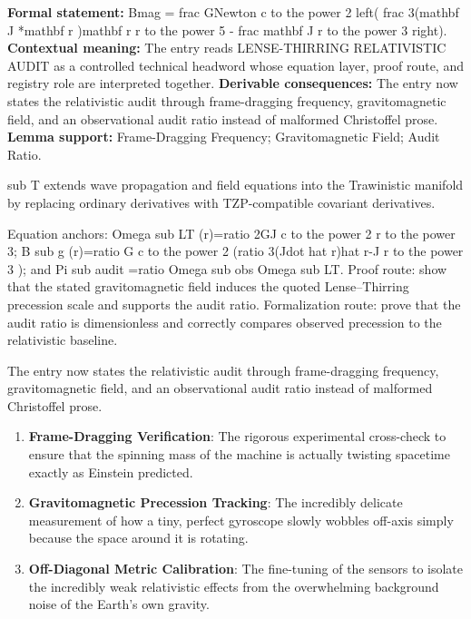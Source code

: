 \begingroup\footnotesize\setlength{\emergencystretch}{3em}\sloppy
\textbf{Formal statement:} Bmag = frac GNewton c to the power 2 left( frac 3(mathbf J *mathbf r )mathbf r r to the power 5 - frac mathbf J r to the power 3 right). \textbf{Contextual meaning:} The entry reads LENSE-THIRRING RELATIVISTIC AUDIT as a controlled technical headword whose equation layer, proof route, and registry role are interpreted together. \textbf{Derivable consequences:} The entry now states the relativistic audit through frame-dragging frequency, gravitomagnetic field, and an observational audit ratio instead of malformed Christoffel prose. \textbf{Lemma support:} Frame-Dragging Frequency; Gravitomagnetic Field; Audit Ratio.\par
\endgroup

sub T extends wave propagation and field equations into the Trawinistic manifold by replacing ordinary derivatives with TZP-compatible covariant derivatives.

Equation anchors: Omega sub LT (r)=ratio 2GJ c to the power 2 r to the power 3; B sub g (r)=ratio G c to the power 2 (ratio 3(Jdot hat r)hat r-J r to the power 3 ); and Pi sub audit =ratio Omega sub obs Omega sub LT. Proof route: show that the stated gravitomagnetic field induces the quoted Lense--Thirring precession scale and supports the audit ratio. Formalization route: prove that the audit ratio is dimensionless and correctly compares observed precession to the relativistic baseline.

The entry now states the relativistic audit through frame-dragging frequency, gravitomagnetic field, and an observational audit ratio instead of malformed Christoffel prose.
\endgroup

\begin{enumerate}[leftmargin=1.6em,itemsep=6pt,topsep=4pt]
\item \textbf{Frame-Dragging Verification}: The rigorous experimental cross-check to ensure that the spinning mass of the machine is actually twisting spacetime exactly as Einstein predicted.
\item \textbf{Gravitomagnetic Precession Tracking}: The incredibly delicate measurement of how a tiny, perfect gyroscope slowly wobbles off-axis simply because the space around it is rotating.
\item \textbf{Off-Diagonal Metric Calibration}: The fine-tuning of the sensors to isolate the incredibly weak relativistic effects from the overwhelming background noise of the Earth's own gravity.
\end{enumerate}

